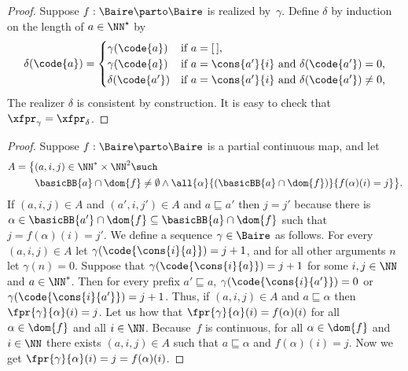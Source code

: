 \begin{proof}
  Suppose $f : \Baire \parto \Baire$ is realized by~$\gamma$. Define
  $\delta$ by induction on the length of $a \in \NN^{\star}$ by
  \begin{equation*}
    \delta(\code{a}) =
    \begin{cases}
      \gamma(\code{a}) & \text{if $a = [\,]$,}\\
      \gamma(\code{a}) & \text{if $a = \cons{a'}{i}$ and
        $\delta(\code{a'}) = 0$,}\\
      \delta(\code{a'}) & \text{if $a = \cons{a'}{i}$ and
        $\delta(\code{a'}) \neq 0$,}
    \end{cases}
  \end{equation*}
  The realizer $\delta$ is consistent by construction. It is easy to check that $\xfpr_\gamma = \xfpr_\delta$.
\end{proof}


\begin{proof}
  Suppose $f: \Baire \parto \Baire$ is a partial continuous map, and let
  \begin{align*}
     A = \big\{ & (a, i, j) \in \NN^{*} \times \NN^{2} \such \\
       &\basicBB{a} \cap \dom{f} \neq \emptyset \land
        \all{\alpha}{(\basicBB{a} \cap \dom{f})}{
          f(\alpha)(i) = j
          }
        \big\}.
  \end{align*}
  If $(a, i, j) \in A$ and $(a', i, j') \in A$ and $a \sqsubseteq a'$
  then $j = j'$ because there is $\alpha \in \basicBB{a'} \cap
  \dom{f} \subseteq \basicBB{a} \cap \dom{f}$ such that $j =
  f(\alpha)(i) = j'$. We define a sequence $\gamma \in \Baire$ as
  follows. For every $(a, i, j) \in A$ let
  $\gamma(\code{\cons{i}{a}}) = j + 1$, and for all other
  arguments $n$ let $\gamma(n) = 0$. Suppose that
  $\gamma(\code{\cons{i}{a}}) = j + 1$ for some $i, j \in \NN$
  and $a \in \NN^{*}$. Then for every prefix $a' \sqsubseteq a$,
  $\gamma(\code{\cons{i}{a'}}) = 0$ or
  $\gamma(\code{\cons{i}{a'}}) = j + 1$. Thus, if $(a, i, j) \in
  A$ and $a \sqsubseteq \alpha$ then $\fpr{\gamma}{\alpha}(i) = j$.
  Let us how that $\fpr{\gamma}{\alpha}(i) = f(\alpha)(i)$ for all
  $\alpha \in \dom{f}$ and all $i \in \NN$. Because~$f$ is continuous,
  for all $\alpha \in \dom{f}$ and $i \in \NN$ there exists $(a, i, j)
  \in A$ such that $a \sqsubseteq \alpha$ and $f(\alpha)(i) = j$. Now
  we get
  $
    \fpr{\gamma}{\alpha}(i)
    = j
    = f(\alpha)(i)
  $.
\end{proof}

